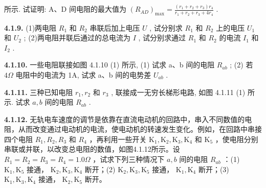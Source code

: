 所示. 试证明: A、D 间电阻的最大值为 $\displaystyle (R_{AD})_{\max} = \frac{(r_{1} + r_{2} + r_{3})r_{4}}{r_{1} + r_{2} + r_{3} + 4r_{4}}$ .

\begin{center}
\end{center}

\vfill
\newpage

\textbf{4.1.9.} (1)两电阻 $R_{1}$ 和 $R_{2}$ 串联后加上电压 $U$ , 试分别求 $R_{1}$ 和 $R_{2}$ 上的电压 $U_{1}$ 和 $U_{2}$ ; (2)两电阻并联后通过的总电流为 $I$ , 试分别求通过 $R_{1}$ 和 $R_{2}$ 的电流 $I_{1}$ 和 $I_{2}$ .

\vfill
\newpage

\textbf{4.1.10.} 一些电阻联接如图 4.1.10 (1) 所示, (1) 试求 a、b 间的电阻 $R_{ab}$ ; (2) 若 $4\Omega$ 电阻中的电流为 1A, 试求 a、b 间的电势差 $U_{ab}$ .

\begin{center}
\end{center}

\vfill
\newpage

\textbf{4.1.11.} 三种已知电阻 $r_1, r_2$ 和 $r_3$ , 联接成一无穷长梯形电路, 如图 4.1.11 (1) 所示. 试求 $a, b$ 间的电阻 $R_{ab}$ .

\begin{center}
\end{center}

\vfill
\newpage

\textbf{4.1.12.} 无轨电车速度的调节是依靠在直流电动机的回路中，串入不同数值的电阻，从而改变通过电动机的电流，使电动机的转速发生变化。例如，在回路中串接四个电阻 $R_{1}, R_{2}, R_{3}$ 和 $R_{4}$ ，再利用一些开关 $\mathrm{K}_{1}, \mathrm{K}_{2}, \mathrm{K}_{3}, \mathrm{K}_{4}$ 和 $\mathrm{K}_{5}$ ，使电阻分别串联或并联，以改变总电阻的数值，如图4.1.12所示。设 $R_{1} = R_{2} = R_{3} = R_{4} = 1.0\Omega$ ，试求下列三种情况下 $a, b$ 间的电阻 $R_{ab}$ ：(1) $\mathrm{K}_{1}, \mathrm{K}_{5}$ 接通， $\mathrm{K}_{2}, \mathrm{K}_{3}, \mathrm{K}_{4}$ 断开；(2) $\mathrm{K}_{2}, \mathrm{K}_{3}, \mathrm{K}_{5}$ 接通， $\mathrm{K}_{1}, \mathrm{K}_{4}$ 断开；(3) $\mathrm{K}_{1}, \mathrm{K}_{3}, \mathrm{K}_{4}$ 接通， $\mathrm{K}_{2}, \mathrm{K}_{5}$ 断开。

\begin{center}
\end{center}


